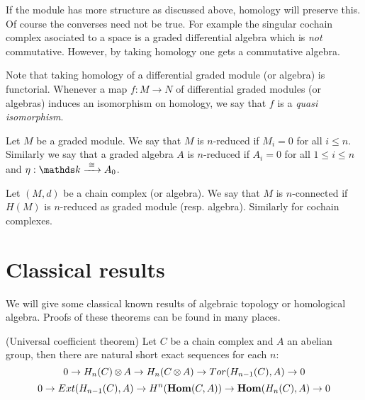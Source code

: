 
If the module has more structure as discussed above, homology will preserve this.
Of course the converses need not be true. For example the singular cochain complex asociated to a space is a graded differential algebra which is \emph{not} commutative. However, by taking homology one gets a commutative algebra.

Note that taking homology of a differential graded module (or algebra) is functorial. Whenever a map $f: M \to N$ of differential graded modules (or algebras) induces an isomorphism on homology, we say that $f$ is a \emph{quasi isomorphism}.

\begin{definition}
	Let $M$ be a graded module. We say that $M$ is $n$-reduced if $M_i = 0$ for all $i \leq n$. Similarly we say that a graded algebra $A$ is $n$-reduced if $A_i = 0$ for all $1 \leq i \leq n$ and $\eta: \k \tot{\iso} A_0$.

	Let $(M, d)$ be a chain complex (or algebra). We say that $M$ is $n$-connected if $H(M)$ is $n$-reduced as graded module (resp. algebra). Similarly for cochain complexes.
\end{definition}


\section{Classical results}

We will give some classical known results of algebraic topology or homological algebra. Proofs of these theorems can be found in many places. 

\begin{theorem}
	(Universal coefficient theorem) Let $C$ be a chain complex and $A$ an abelian group, then there are natural short exact sequences for each $n$:
	$$ 0 \to H_n(C) \operatorname*{\otimes} A \to H_n(C \operatorname*{\otimes} A) \to Tor(H_{n-1}(C), A) \to 0 $$
	$$ 0 \to Ext(H_{n-1}(C), A) \to H^n(\mathbf{Hom}(C, A)) \to \mathbf{Hom}(H_n(C), A) \to 0 $$
\end{theorem}

